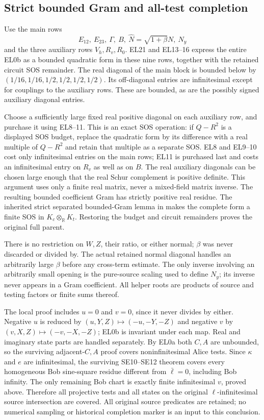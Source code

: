 \subsection{Strict bounded Gram and all-test completion}
Use the main rows
\[
 E_{12},\ E_{23},\ \Gamma,\ B,\ \widehat N=\sqrt{1+\beta}N,
 \ N_y
\]
and the three auxiliary rows $V_h,R_v,R_0$.
EL21 and EL13--16 express the entire EL0b as a bounded quadratic
form in these nine rows, together with the retained circuit SOS
remainder.  The real diagonal of the main block is bounded below
by $(1/16,1/16,1/2,1/2,1/2,1/2)$.
Its off-diagonal entries are infinitesimal except for couplings to
the auxiliary rows.  These are bounded, as are the possibly signed
auxiliary diagonal entries.

Choose a sufficiently large fixed real positive diagonal on each
auxiliary row, and purchase it using EL8--11.  This is an exact
SOS operation: if $Q-R^2$ is a displayed SOS budget, replace the
quadratic form by its difference with a real multiple of $Q-R^2$
and retain that multiple as a separate SOS.  EL8 and EL9--10 cost
only infinitesimal entries on the main rows; EL11 is purchased
last and costs an infinitesimal entry on $R_v$ as well as on $B$.
The real auxiliary diagonals can be chosen large enough that the
real Schur complement is positive definite.  This argument uses
only a finite real matrix, never a mixed-field matrix inverse.
The resulting bounded coefficient Gram has strictly positive real
residue.  The inherited strict separated bounded-Gram lemma in
 makes the complete form a finite
SOS in $K_c\otimes_{\mathbb R}K_t$.  Restoring the budget and circuit
remainders proves the original full parent.

There is no restriction on $W,Z$, their ratio, or either normal;
$\beta$ was never discarded or divided by.  The actual retained
normal diagonal handles an arbitrarily large $\beta$ before any
cross-term estimate.  The only inverse involving an arbitrarily
small opening is the pure-source scaling used to define $N_y$;
its inverse never appears in a Gram coefficient.  All helper roots
are products of source and testing factors or finite sums thereof.

The local proof includes $u=0$ and $v=0$, since it never divides
by either.  Negative $u$ is reduced by
$(u,Y,Z)\mapsto(-u,-Y,-Z)$ and negative $v$ by
$(v,X,Z)\mapsto(-v,-X,-Z)$; EL0b is invariant under each map.
Real and imaginary state parts are handled separately.
By EL0a both $C,A$ are unbounded, so the surviving adjacent-$C,A$
proof covers noninfinitesimal Alice tests.  Since $\kappa$ and $e$
are infinitesimal, the surviving SE10--SE12 theorem covers every
homogeneous Bob sine-square residue different from $\bar\ell=0$,
including Bob infinity.  The only remaining Bob chart is exactly
finite infinitesimal $v$, proved above.  Therefore all projective
tests and all states on the original $\ell$-infinitesimal source
intersection are covered.  All original source predicates are
retained; no numerical sampling or historical completion marker
is an input to this conclusion.
